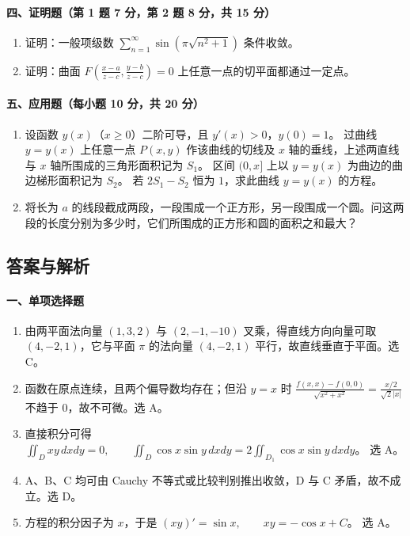 \paragraph*{四、证明题（第 1 题 7 分，第 2 题 8 分，共 15 分）}

\begin{enumerate}
  \item 证明：一般项级数 \(\displaystyle \sum_{n=1}^{\infty}\sin\left(\pi\sqrt{n^2+1}\right)\)
  条件收敛。

  \item 证明：曲面 \(\displaystyle F\left(\frac{x-a}{z-c},\frac{y-b}{z-c}\right)=0\)
  上任意一点的切平面都通过一定点。
\end{enumerate}

\paragraph*{五、应用题（每小题 10 分，共 20 分）}

\begin{enumerate}
  \item 设函数 $y(x)$（$x\ge 0$）二阶可导，且 $y'(x)>0$，$y(0)=1$。
  过曲线 $y=y(x)$ 上任意一点 $P(x,y)$ 作该曲线的切线及 $x$ 轴的垂线，上述两直线与 $x$ 轴所围成的三角形面积记为 $S_1$。
  区间 $(0,x]$ 上以 $y=y(x)$ 为曲边的曲边梯形面积记为 $S_2$。
  若 $2S_1-S_2$ 恒为 $1$，求此曲线 $y=y(x)$ 的方程。

  \item 将长为 $a$ 的线段截成两段，一段围成一个正方形，另一段围成一个圆。问这两段的长度分别为多少时，它们所围成的正方形和圆的面积之和最大？
\end{enumerate}

\subsection{答案与解析}

\paragraph*{一、单项选择题}
\begin{enumerate}
  \item 由两平面法向量 $(1,3,2)$ 与 $(2,-1,-10)$ 叉乘，得直线方向向量可取 $(4,-2,1)$，它与平面 $\pi$ 的法向量 $(4,-2,1)$ 平行，故直线垂直于平面。选 C。
  \item 函数在原点连续，且两个偏导数均存在；但沿 $y=x$ 时 \(\displaystyle \frac{f(x,x)-f(0,0)}{\sqrt{x^2+x^2}}=\frac{x/2}{\sqrt2|x|}\)
  不趋于 $0$，故不可微。选 A。
  \item 直接积分可得
  \(\displaystyle \iint_Dxy\,dxdy=0,\qquad
  \iint_D\cos x\sin y\,dxdy=2\iint_{D_1}\cos x\sin y\,dxdy\)。
  选 A。
  \item A、B、C 均可由 Cauchy 不等式或比较判别推出收敛，D 与 C 矛盾，故不成立。选 D。
  \item 方程的积分因子为 $x$，于是 \(\displaystyle (xy)'=\sin x,\qquad xy=-\cos x+C\)。
  选 A。
\end{enumerate}


